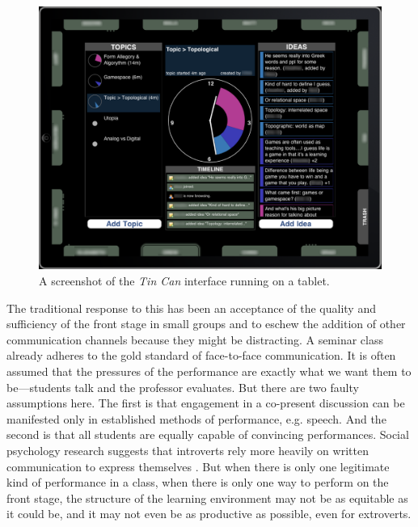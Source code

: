 \begin{figure}[t]
\centering
\includegraphics{figures/tincan/tincan_interface.png}
\caption{A screenshot of the \emph{Tin Can} interface running on a tablet.}
\label{f:interface}
\end{figure}

The traditional response to this has been an acceptance of the quality and sufficiency of the front stage in small groups and to eschew the addition of other communication channels because they might be distracting.  A seminar class already adheres to the gold standard of face-to-face communication. It is often assumed that the pressures of the performance are exactly what we want them to be---students talk and the professor evaluates.  But there are two faulty assumptions here.  The first is that engagement in a co-present discussion can be manifested only in established methods of performance, e.g.  speech. And the second is that all students are equally capable of convincing performances. Social psychology research suggests that introverts rely more heavily on written communication to express themselves \citep{Ross:2009gp. Wilson:2010ib}. But when there is only one legitimate kind of performance in a class, when there is only one way to perform on the front stage, the structure of the learning environment may not be as equitable as it could be, and it may not even be as productive as possible, even for extroverts. 


